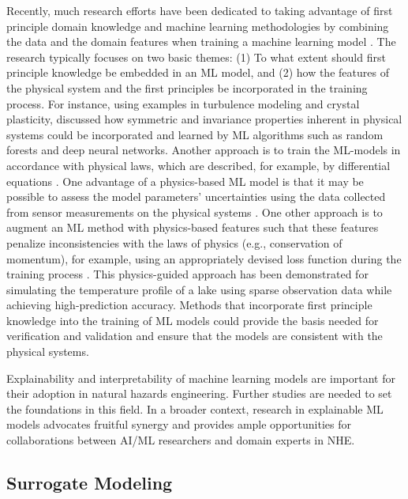 Recently, much research efforts have been dedicated to taking advantage of first principle domain knowledge and machine learning methodologies by combining the data and the domain features when training a machine learning model \citep{willard2020integrating}. The research typically focuses on two basic themes: (1) To what extent should first principle knowledge be embedded in an ML model, and (2) how the features of the physical system and the first principles be incorporated in the training process. For instance, using examples in turbulence modeling and crystal plasticity, \cite{ling2016machine} discussed how symmetric and invariance properties inherent in physical systems could be incorporated and learned by ML algorithms such as random forests and deep neural networks. Another approach is to train the ML-models in accordance with physical laws, which are described, for example, by differential equations \citep{raissi2019physicsinformed}. One advantage of a physics-based ML model is that it may be possible to assess the model parameters' uncertainties using the data collected from sensor measurements on the physical systems \citep{zhang2019quantifying}. One other approach is to augment an ML method with physics-based features such that these features penalize inconsistencies with the laws of physics (e.g., conservation of momentum), for example, using an appropriately devised loss function during the training process \citep{jia2020physicsguided}. This physics-guided approach has been demonstrated for simulating the temperature profile of a lake using sparse observation data while achieving high-prediction accuracy. Methods that incorporate first principle knowledge into the training of ML models could provide the basis needed for verification and validation and ensure that the models are consistent with the physical systems. 

Explainability and interpretability of machine learning models are important for their adoption in natural hazards engineering. Further studies are needed to set the foundations in this field. In a broader context, research in explainable ML models advocates fruitful synergy and provides ample opportunities for collaborations between AI/ML researchers and domain experts in NHE.

\subsection{Surrogate Modeling}

